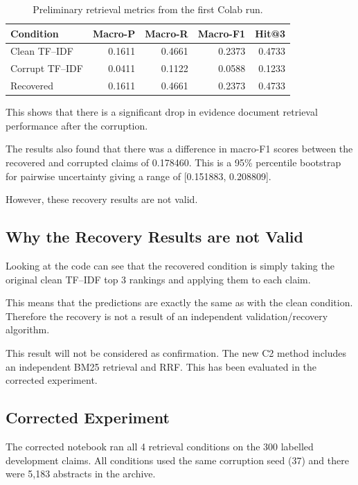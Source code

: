 \documentclass[11pt,a4paper]{article}
\begin{document}
\begin{table}[H]
\centering
\caption{Preliminary retrieval metrics from the first Colab run.}
\label{tab:pilot}
\begin{tabular}{lrrrr}
\toprule
\textbf{Condition} & \textbf{Macro-P} & \textbf{Macro-R} & \textbf{Macro-F1} & \textbf{Hit@3}\\
\midrule
Clean TF--IDF & 0.1611 & 0.4661 & 0.2373 & 0.4733\\
Corrupt TF--IDF & 0.0411 & 0.1122 & 0.0588 & 0.1233\\
Recovered & 0.1611 & 0.4661 & 0.2373 & 0.4733\\
\bottomrule
\end{tabular}
\end{table}

This shows that there is a significant drop in evidence document retrieval performance after the corruption.

The results also found that there was a difference in macro-F1 scores between the recovered and corrupted claims of 0.178460. This is a 95\% percentile bootstrap for pairwise uncertainty giving a range of [0.151883, 0.208809].

However, these recovery results are not valid.

\subsection{Why the Recovery Results are not Valid}

Looking at the code can see that the recovered condition is simply taking the original clean TF--IDF top 3 rankings and applying them to each claim.

This means that the predictions are exactly the same as with the clean condition. Therefore the recovery is not a result of an independent validation/recovery algorithm.

This result will not be considered as confirmation. The new C2 method includes an independent BM25 retrieval and RRF. This has been evaluated in the corrected experiment.

\subsection{Corrected Experiment}

The corrected notebook ran all 4 retrieval conditions on the 300 labelled development claims. All conditions used the same corruption seed (37) and there were 5,183 abstracts in the archive.
\end{document}
